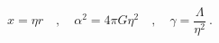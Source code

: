 \begin{equation}
     x = \eta r \quad , \quad 
     \alpha^2 = 4 \pi G \eta^2 \quad , \quad  
     \gamma = \frac{\Lambda}{\eta^2} \ .
\end{equation}

